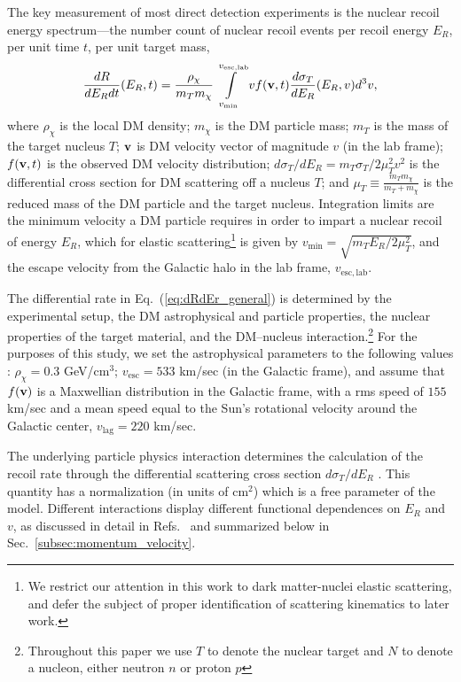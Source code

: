 \documentclass[11pt]{article}
\newcommand{\Eq}[1]{Eq.~(\ref{#1})} \newcommand{\Eqs}[2]{Eqs.~(\ref{#1}) and (\ref{#2})} \newcommand{\Eqm}[2]{Eqs.~(\ref{#1}) through (\ref{#2})}
\newcommand{\Sec}[1]{Sec.~\ref{#1}} \newcommand{\Secs}[2]{Secs.~\ref{#1} and \ref{#2}} \newcommand{\Secm}[2]{Secs.~\ref{#1} through \ref{#2}}
\begin{document}
The key measurement of most direct detection experiments is the nuclear recoil energy spectrum---the number count of nuclear recoil events per recoil energy $E_R$, per unit time $t$, per unit target mass,
\begin{equation}
\frac{dR}{dE_R dt}(E_R,t) =  \frac{\rho_\chi}{m_T m_\chi} \int\limits_{v_{\mathrm{min}}}^{v_{\mathrm{esc, lab}}}  v f(\mathrm{\mbox{\bf{v}}},t) \frac{d\sigma_T}{dE_R} (E_R,v) d^3v ,
\label{eq:dRdEr_general}
\end{equation}
where $\rho_\chi$ is the local DM density; $m_\chi$ is the DM particle mass; $m_T$ is the mass of the target nucleus $T$; $\mathrm{\mbox{\bf{v}}}$ is DM velocity vector of magnitude $v$ (in the lab frame); $f(\mathrm{\mbox{\bf{v}}}, t)$ is the observed DM velocity distribution; $d\sigma_T/dE_R=m_T \sigma_T /2\mu_T^2 v^2$ is the differential cross section for DM scattering off a nucleus $T$; and $\mu_T\equiv\frac{m_Tm_\chi}{m_T+m_\chi}$ is the reduced mass of the DM particle and the target nucleus. Integration limits are the minimum velocity a DM particle requires in order to impart a nuclear recoil of energy $E_R$, which for elastic scattering\footnote{We restrict our attention in this work to dark matter-nuclei elastic scattering, and defer the subject of proper identification of scattering kinematics to later work.} is given by $v_\mathrm{min} = \sqrt{m_T E_R/2\mu_T^2}$, and the escape velocity from the Galactic halo in the lab frame, $v_{\mathrm{esc, lab}}$.

The differential rate in \Eq{eq:dRdEr_general} is determined by the experimental setup, the DM astrophysical and particle properties, the nuclear properties of the target material, and the DM--nucleus interaction.\footnote{Throughout this paper we use $T$ to denote the nuclear target and $N$ to denote a nucleon, either neutron $n$ or proton $p$} For the purposes of this study, we set the astrophysical parameters to the following values \cite{Bovy:2013raa,Piffl:2013mla}: $\rho_\chi=0.3$ GeV/cm$^3$; $v_{\mathrm{esc}} = 533$ km/sec (in the Galactic frame), and assume that $f(\mathrm{\mbox{\bf{v}}})$ is a Maxwellian distribution in the Galactic frame, with a rms speed of $155$ km/sec and a mean speed equal to the Sun's rotational velocity around the Galactic center, $v_\textrm{lag}=220$ km/sec.

The underlying particle physics interaction determines the calculation of the recoil rate through the differential scattering cross section ${d\sigma_T}/{dE_R}$ \cite{Gluscevic:2015sqa,Gresham:2014vja}. This quantity has a normalization (in units of cm${}^2$) which is a free parameter of the model. Different interactions display different functional dependences on $E_R$ and $v$, as discussed in detail in Refs.~\cite{Gluscevic:2015sqa,Gresham:2014vja} and summarized below in \Sec{subsec:momentum_velocity}.
\end{document}
